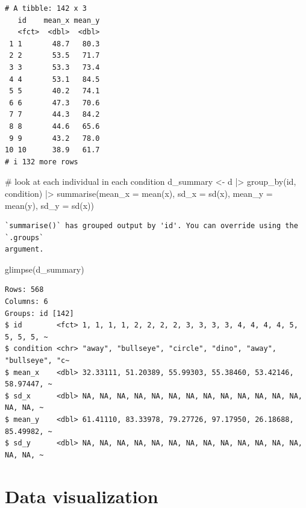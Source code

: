 \documentclass[
  letterpaper,
  DIV=11,
  numbers=noendperiod,
  oneside]{scrreprt}
\newenvironment{Shaded}{\begin{snugshade}}{\end{snugshade}}
\newcommand{\AttributeTok}[1]{\textcolor[rgb]{0.40,0.45,0.13}{#1}}
\newcommand{\CommentTok}[1]{\textcolor[rgb]{0.37,0.37,0.37}{#1}}
\newcommand{\FunctionTok}[1]{\textcolor[rgb]{0.28,0.35,0.67}{#1}}
\newcommand{\NormalTok}[1]{\textcolor[rgb]{0.00,0.23,0.31}{#1}}
\newcommand{\OtherTok}[1]{\textcolor[rgb]{0.00,0.23,0.31}{#1}}
\newcommand{\SpecialCharTok}[1]{\textcolor[rgb]{0.37,0.37,0.37}{#1}}
\begin{document}
\begin{verbatim}
# A tibble: 142 x 3
   id    mean_x mean_y
   <fct>  <dbl>  <dbl>
 1 1       48.7   80.3
 2 2       53.5   71.7
 3 3       53.3   73.4
 4 4       53.1   84.5
 5 5       40.2   74.1
 6 6       47.3   70.6
 7 7       44.3   84.2
 8 8       44.6   65.6
 9 9       43.2   78.0
10 10      38.9   61.7
# i 132 more rows
\end{verbatim}

\begin{Shaded}
\begin{Highlighting}[]
\CommentTok{\# look at each individual in each condition}
\NormalTok{d\_summary }\OtherTok{\textless{}{-}}\NormalTok{ d }\SpecialCharTok{|\textgreater{}} \FunctionTok{group\_by}\NormalTok{(id, condition) }\SpecialCharTok{|\textgreater{}}
    \FunctionTok{summarise}\NormalTok{(}\AttributeTok{mean\_x =} \FunctionTok{mean}\NormalTok{(x),}
              \AttributeTok{sd\_x =} \FunctionTok{sd}\NormalTok{(x),}
              \AttributeTok{mean\_y =} \FunctionTok{mean}\NormalTok{(y),}
              \AttributeTok{sd\_y =} \FunctionTok{sd}\NormalTok{(x))}
\end{Highlighting}
\end{Shaded}

\begin{verbatim}
`summarise()` has grouped output by 'id'. You can override using the `.groups`
argument.
\end{verbatim}

\begin{Shaded}
\begin{Highlighting}[]
\FunctionTok{glimpse}\NormalTok{(d\_summary)}
\end{Highlighting}
\end{Shaded}

\begin{verbatim}
Rows: 568
Columns: 6
Groups: id [142]
$ id        <fct> 1, 1, 1, 1, 2, 2, 2, 2, 3, 3, 3, 3, 4, 4, 4, 4, 5, 5, 5, 5, ~
$ condition <chr> "away", "bullseye", "circle", "dino", "away", "bullseye", "c~
$ mean_x    <dbl> 32.33111, 51.20389, 55.99303, 55.38460, 53.42146, 58.97447, ~
$ sd_x      <dbl> NA, NA, NA, NA, NA, NA, NA, NA, NA, NA, NA, NA, NA, NA, NA, ~
$ mean_y    <dbl> 61.41110, 83.33978, 79.27726, 97.17950, 26.18688, 85.49982, ~
$ sd_y      <dbl> NA, NA, NA, NA, NA, NA, NA, NA, NA, NA, NA, NA, NA, NA, NA, ~
\end{verbatim}


\hypertarget{data-visualization}{%
\chapter{Data visualization}\label{data-visualization}}
\end{document}
